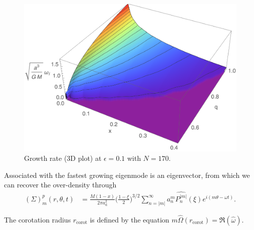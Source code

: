 \documentclass[11pt]{article}
\newcommand{\ad}{a_{\mathrm{d}}}
\newcommand{\anm}{a_n^m}
\newcommand{\Pnm}{P_n^{|m|}}
\newcommand{\hPnm}{\widehat{\Pnm}}
\newcommand{\homega}{\widehat{\omega}}
\newcommand{\hOmega}{\widehat{\Omega}}
\begin{document}
\begin{figure}
    \centering
   \includegraphics[width=0.6 \textwidth]{figs/growthRate3D_eps0_1.png}
   \caption{Growth rate (3D plot) at $\epsilon=0.1$ with $N=170$.}
   \label{fig:growthRate3D}
\end{figure}

Associated with the fastest growing eigenmode is an eigenvector, from which we can recover the over-density through
\begin{align}
(\Sigma)_m^p (r,\theta,t) &= \frac{M(1-x)}{2\pi \ad^2} \bigg(\frac{1-\xi}{2}\bigg)^{3/2} \sum_{n=|m|}^{\infty} \anm \hPnm(\xi) e^{i (m \theta- \omega t)} .
\end{align}

The corotation radius $r_{\mathrm{corot}}$ is defined by the equation $m \hOmega(r_{\mathrm{corot}}) = \Re(\homega)$.
\end{document}
